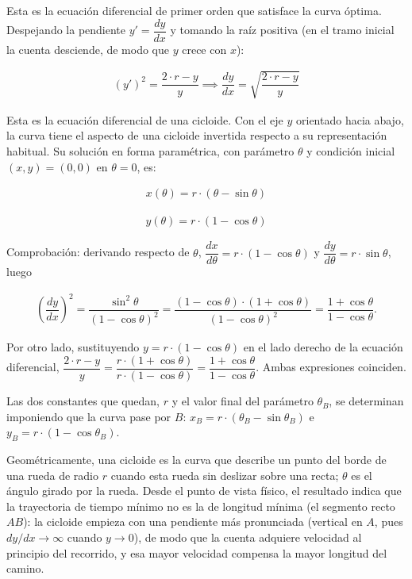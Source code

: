 \documentclass[
  spanish,
]{article}
\begin{document}
Esta es la ecuación diferencial de primer orden que satisface la curva
óptima. Despejando la pendiente \(y' = \dfrac{dy}{dx}\) y tomando la
raíz positiva (en el tramo inicial la cuenta desciende, de modo que
\(y\) crece con \(x\)):

\[
\begin{aligned}
(y')^2 = \dfrac{2 \cdot r - y}{y} \implies \dfrac{dy}{dx} = \sqrt{\dfrac{2 \cdot r - y}{y}}
\end{aligned}
\]

Esta es la ecuación diferencial de una cicloide. Con el eje \(y\)
orientado hacia abajo, la curva tiene el aspecto de una cicloide
invertida respecto a su representación habitual. Su solución en forma
paramétrica, con parámetro \(\theta\) y condición inicial
\((x,y) = (0,0)\) en \(\theta = 0\), es:

\[
\begin{aligned}
x(\theta) = r \cdot (\theta - \sin \theta)
\end{aligned}
\]

\[
\begin{aligned}
y(\theta) = r \cdot (1 - \cos \theta)
\end{aligned}
\]

Comprobación: derivando respecto de \(\theta\),
\(\dfrac{dx}{d\theta} = r \cdot (1 - \cos\theta)\) y
\(\dfrac{dy}{d\theta} = r \cdot \sin\theta\), luego

\[
\begin{aligned}
\left(\dfrac{dy}{dx}\right)^2
= \dfrac{\sin^2\theta}{(1-\cos\theta)^2}
= \dfrac{(1-\cos\theta) \cdot (1+\cos\theta)}{(1-\cos\theta)^2}
= \dfrac{1+\cos\theta}{1-\cos\theta}.
\end{aligned}
\]

Por otro lado, sustituyendo \(y = r \cdot (1-\cos\theta)\) en el lado
derecho de la ecuación diferencial,
\(\dfrac{2 \cdot r - y}{y} = \dfrac{r \cdot (1+\cos\theta)}{r \cdot (1-\cos\theta)} = \dfrac{1+\cos\theta}{1-\cos\theta}\).
Ambas expresiones coinciden.

Las dos constantes que quedan, \(r\) y el valor final del parámetro
\(\theta_B\), se determinan imponiendo que la curva pase por \(B\):
\(x_B = r \cdot (\theta_B - \sin\theta_B)\) e
\(y_B = r \cdot (1 - \cos\theta_B)\).

Geométricamente, una cicloide es la curva que describe un punto del
borde de una rueda de radio \(r\) cuando esta rueda sin deslizar sobre
una recta; \(\theta\) es el ángulo girado por la rueda. Desde el punto
de vista físico, el resultado indica que la trayectoria de tiempo mínimo
no es la de longitud mínima (el segmento recto \(AB\)): la cicloide
empieza con una pendiente más pronunciada (vertical en \(A\), pues
\(dy/dx \to \infty\) cuando \(y \to 0\)), de modo que la cuenta adquiere
velocidad al principio del recorrido, y esa mayor velocidad compensa la
mayor longitud del camino.
\end{document}
